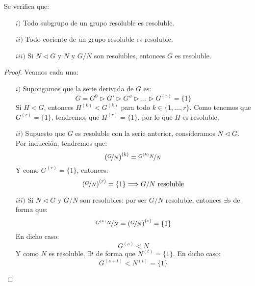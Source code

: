\begin{prop}
    Se verifica que:
    \begin{enumerate}
        \item[$i)$] Todo subgrupo de un grupo resoluble es resoluble.
        \item[$ii)$] Todo cociente de un grupo resoluble es resoluble.
        \item[$iii)$] Si $N\lhd G$ y $N$ y $G/N$ son resolubles, entonces $G$ es resoluble.
    \end{enumerate}
    \begin{proof}
        Veamos cada una:
        \begin{enumerate}
            \item[$i)$] Supongamos que la serie derivada de $G$ es:
                \begin{equation*}
                    G = G^0 \rhd G' \rhd G '' \rhd \ldots \rhd G^{(r)} = \{1\}
                \end{equation*}
                Si $H<G$, entonces $H^{(k)} < G^{(k)}$ para todo $k \in \{1,\ldots,r\}$. Como tenemos que $G^{(r)} = \{1\}$, tendremos que $H^{(r)} = \{1\}$, por lo que $H$ es resoluble.
            \item[$ii)$] Supuesto que $G$ es resoluble con la serie anterior, consideramos $N\lhd G$. Por inducción, tendremos que: 
                \begin{equation*}
                    {(\nicefrac{G}{N})}^{(k)} = \nicefrac{G^{(k)}N}{N}
                \end{equation*}
                Y como $G^{(r)} = \{1\}$, entonces:
                \begin{equation*}
                    {(\nicefrac{G}{N})}^{(r)} = \{1\} \Longrightarrow G/N \text{\ resoluble}
                \end{equation*}
            \item[$iii)$] Si $N\lhd G$ y $G/N$ son resolubles: por ser $G/N$ resoluble, entonces $\exists s$ de forma que:
                \begin{equation*}
                    \nicefrac{G^{(k)}N}{N} = {(\nicefrac{G}{N})}^{(s)} = \{1\}
                \end{equation*}
                En dicho caso:
                \begin{equation*}
                    G^{(s)} < N
                \end{equation*}
                Y como $N$ es resoluble, $\exists t$ de forma que $N^{(t)} = \{1\}$. En dicho caso:
                \begin{equation*}
                    G^{(s+t)} < N^{(t)} = \{1\}
                \end{equation*}
        \end{enumerate}
    \end{proof}
\end{prop}

